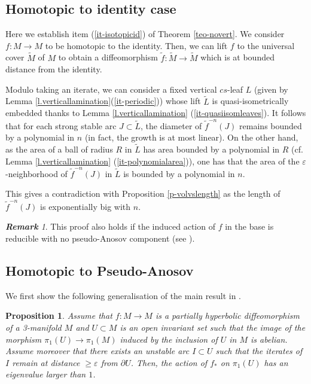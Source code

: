 \documentclass[11pt]{amsart} %
\newcommand{\eps}{\varepsilon}
\numberwithin{equation}{section}
\newtheorem{prop}[equation]{Proposition}
\theoremstyle{remark}
\newtheorem*{remark} {\textbf{Remark}}
\begin{document}
\subsection{Homotopic to identity case}\label{ss.homotId}

Here we establish item (\ref{it-isotopicid}) of Theorem \ref{teo-novert}. We consider $f:M\to M$ to be homotopic to the identity. Then, we can lift $f$ to the universal cover $\tilde M$ of $M$ to obtain a diffeomorphism $\tilde f: \tilde M \to \tilde M$ which is at bounded distance from the identity. 

Modulo taking an iterate, we can consider a fixed vertical $cs$-leaf $L$ (given by Lemma \ref{l.verticallamination}(\ref{it-periodic})) whose lift $\tilde L$ is quasi-isometrically embedded thanks to Lemma \ref{l.verticallamination} (\ref{it-quasiisomleaves}). It follows that for each strong stable arc $J \subset \tilde L$, the  diameter of $\tilde f^{-n}(J)$ remains bounded by a polynomial in $n$ (in fact, the growth is at most linear). On the other hand, as the area of a ball of radius $R$ in $\tilde L$ has area bounded by a polynomial in $R$ (cf. Lemma \ref{l.verticallamination} (\ref{it-polynomialarea})), one has that the area of the $\eps$-neighborhood of $\tilde f^{-n}(J)$ in $\tilde L$ is bounded by a polynomial in $n$.

This gives a contradiction with Proposition \ref{p-volvslength} as the length of $\tilde f^{-n}(J)$ is exponentially big with $n$. 


\begin{remark}
This proof also holds if the induced action of $f$ in the base is reducible with no pseudo-Anosov component (see \cite[Chapter 1]{Calegari}). 
\end{remark}


\subsection{Homotopic to Pseudo-Anosov}\label{ss.homotPA}

We first show the following generalisation of the main result in \cite{BI}. 

\begin{prop}\label{p-volvslengthsmall}
Assume that $f: M \to M$ is a partially hyperbolic diffeomorphism of a 3-manifold $M$ and $U \subset M$ is an open invariant set such that the image of the morphism $\pi_1(U) \to \pi_1(M)$ induced by the inclusion of $U$ in $M$ is abelian. Assume moreover that there exists an unstable arc $I \subset U$ such that the iterates of $I$ remain at distance $\geq \eps$ from $\partial U$. Then, the action of $f_\ast$ on $\pi_1(U)$ has an eigenvalue larger than $1$. 
\end{prop}
\end{document}
